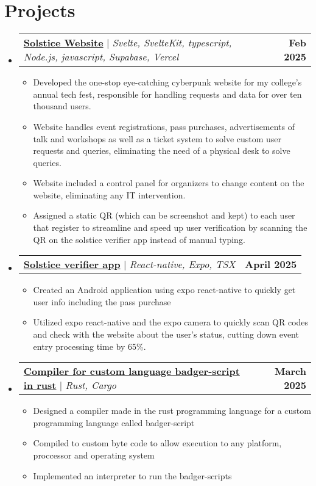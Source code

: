 \documentclass[letterpaper,11pt]{article}
\makeatletter
\newcommand{\resumeItem}[1]{
  \item\small{
    {#1 \vspace{-2pt}}
  }
}
\newcommand{\resumeProjectHeading}[2]{
    \item
    \begin{tabular*}{1.001\textwidth}{l@{\extracolsep{\fill}}r}
      \small#1 & \textbf{\small #2}\\
    \end{tabular*}\vspace{-7pt}
}
\newcommand{\resumeSubHeadingListStart}{\begin{itemize}[leftmargin=0.0in, label={}]}
\newcommand{\resumeSubHeadingListEnd}{\end{itemize}}
\newcommand{\resumeItemListStart}{\begin{itemize}}
\newcommand{\resumeItemListEnd}{\end{itemize}\vspace{-5pt}}
\makeatother
\begin{document}
\section{Projects}
    \vspace{-5pt}
    \resumeSubHeadingListStart
      \resumeProjectHeading
          {\textbf{\href{https://github.com/spicybeanos/mitb-solstice-2025-frontend}{\textbf{Solstice Website}}} $|$ \emph{Svelte, SvelteKit, typescript, Node.js, javascript, Supabase, Vercel}}{Feb 2025}
          \resumeItemListStart
            \resumeItem{Developed the one-stop eye-catching cyberpunk website for my college's annual tech fest, responsible for handling requests and data for over ten thousand users.}
            \resumeItem{Website handles event registrations, pass purchases, advertisements of talk and workshops as well as a ticket system to solve custom user requests and queries, eliminating the need of a physical desk to solve queries.}
            \resumeItem{Website included a control panel for organizers to change content on the website, eliminating any IT intervention.}
            \resumeItem{Assigned a static QR (which can be screenshot and kept) to each user that register to streamline and speed up user verification by scanning the QR on the solstice verifier app instead of manual typing.}
          \resumeItemListEnd
          \vspace{-13pt}
      \resumeProjectHeading
          {\textbf{\href{https://github.com/spicybeanos/solstice-verifier-app}{\textbf{Solstice verifier app}}} $|$ \emph{React-native, Expo, TSX}}{April 2025}
          \resumeItemListStart
            \resumeItem{Created an Android application using expo react-native to quickly get user info including the pass purchase}
            \resumeItem{Utilized expo react-native and the expo camera to quickly scan QR codes and check with the website about the user's status, cutting down event entry processing time by 65\%.}
          \resumeItemListEnd 
          \vspace{-13pt}
          \resumeProjectHeading
          {\textbf{\href{https://github.com/spicybeanos/badger-script}{\textbf{Compiler for custom language badger-script in rust}}} $|$ \emph{Rust, Cargo}}{March 2025}
          \resumeItemListStart
            \resumeItem{Designed a compiler made in the rust programming language for a custom programming language called badger-script}
            \resumeItem{Compiled to custom byte code to allow execution to any platform, proccessor and operating system}
            \resumeItem{Implemented an interpreter to run the badger-scripts}
          \resumeItemListEnd 
    \resumeSubHeadingListEnd
\vspace{-15pt}
\end{document}

